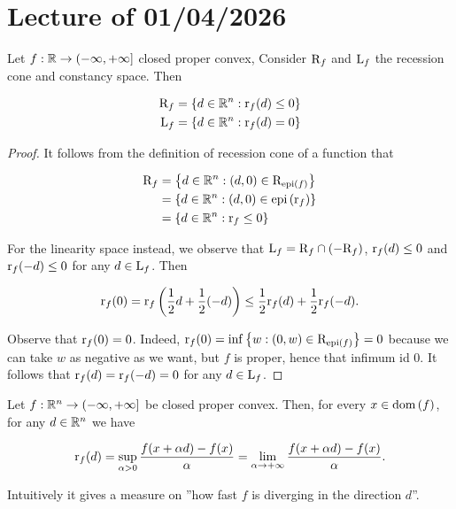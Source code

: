 \chapter{Lecture \thechapter{} of 01/04/2026}

\begin{proposition}[Book 1.4.6]

    Let $f : \mathbb{R} \to (-\infty,+\infty]$ closed proper convex, Consider $\mathrm{R}_{f}$ and $\mathrm{L}_{f}$ the recession cone and constancy space. Then 

    \begin{align*}
        \mathrm{R}_{f} &= \left\{ d \in {\mathbb{R}^n} : \mathrm{r}_{f}(d) \le 0 \right\} \\
        \mathrm{L}_{f} &= \left\{ d \in {\mathbb{R}^n} : \mathrm{r}_{f}(d) = 0 \right\}
    \end{align*}

\end{proposition}

\begin{proof}
    
    It follows from the definition of recession cone of a function that 

    \begin{align*}
        \mathrm{R}_{f} &= \left\{ d \in {\mathbb{R}^n} : (d,0) \in \mathrm{R}_{\mathrm{epi}\left(f\right)} \right\} \\
            &= \left\{ d \in {\mathbb{R}^n} : (d,0) \in \mathrm{epi}\left(\mathrm{r}_{f}\right) \right\} \\
            &= \left\{ d \in {\mathbb{R}^n} : \mathrm{r}_{f} \le 0 \right\}
    \end{align*}

    For the linearity space instead, we observe that $\mathrm{L}_{f} = \mathrm{R}_{f} \cap (-\mathrm{R}_{f})$, $\mathrm{r}_{f}(d) \le 0$ and $\mathrm{r}_{f}(-d) \le 0$ for any $d \in \mathrm{L}_{f}$. Then 

    \[ \mathrm{r}_{f}(0) = \mathrm{r}_{f}\left(\frac12 d + \frac12 (-d)\right) \le \frac12 \mathrm{r}_{f}(d) + \frac12 \mathrm{r}_{f}(-d). \]

    Observe that $\mathrm{r}_{f}(0) = 0$. Indeed, $\mathrm{r}_{f}(0) = \inf \left\{ w : (0,w) \in \mathrm{R}_{\mathrm{epi}\left(f\right)} \right\} = 0$ because we can take $w$ as negative as we want, but $f$ is proper, hence that infimum id 0. It follows that $\mathrm{r}_{f}(d) = \mathrm{r}_{f}(-d) = 0$ for any $d \in \mathrm{L}_{f}$.

\end{proof}

\begin{proposition}[Book 1.4.7]
    
    Let $f : {\mathbb{R}^n} \to (-\infty,+\infty]$ be closed proper convex. Then, for every $x \in \mathrm{dom}\left(f\right)$, for any $d \in {\mathbb{R}^n}$ we have 

    \[ \mathrm{r}_{f}(d) = \sup_{\alpha > 0} \frac{f(x +\alpha d) - f(x)}{\alpha} = \lim_{\alpha \to +\infty} \frac{f(x + \alpha d) - f(x)}{\alpha}. \]

    Intuitively it gives a measure on ''how fast $f$ is diverging in the direction $d$''. 

\end{proposition}

